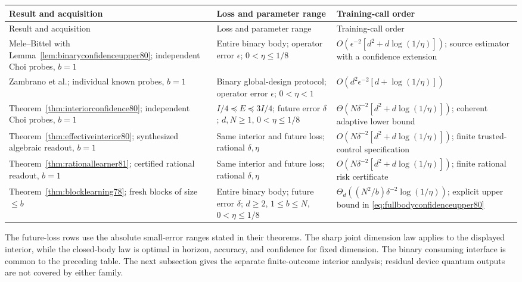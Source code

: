 \begingroup
\small
\setlength{\tabcolsep}{4pt}
\renewcommand{\arraystretch}{1.17}
\begin{longtable}{@{}>{\raggedright\arraybackslash}p{}>{\raggedright\arraybackslash}p{}>{\raggedright\arraybackslash}p{}@{}}
\toprule
Result and acquisition & Loss and parameter range & Training-call order\\
\midrule
\endfirsthead
\toprule
Result and acquisition & Loss and parameter range & Training-call order\\
\midrule
\endhead
Mele--Bittel with Lemma~\ref{lem:binaryconfidenceupper80};
independent Choi probes, $b=1$ &
Entire binary body; operator error $\epsilon$;
$0<\eta\le1/8$ &
$O(\epsilon^{-2}[d^2+d\log(1/\eta)])$;
source estimator with a confidence extension\\
Zambrano et al.; individual known probes, $b=1$ &
Binary global-design protocol; operator error $\epsilon$;
$0<\eta<1$ &
$O(d^2\epsilon^{-2}[d+\log(1/\eta)])$\\
Theorem~\ref{thm:interiorconfidence80}; independent Choi probes,
$b=1$ &
$I/4\preceq E\preceq3I/4$; future error $\delta$;
$d,N\ge1$, $0<\eta\le1/8$ &
$\Theta(N\delta^{-2}[d^2+d\log(1/\eta)])$;
coherent adaptive lower bound\\
Theorem~\ref{thm:effectiveinterior80}; synthesized algebraic
readout, $b=1$ &
Same interior and future loss; rational $\delta,\eta$ &
$O(N\delta^{-2}[d^2+d\log(1/\eta)])$;
finite trusted-control specification\\
Theorem~\ref{thm:rationallearner81}; certified rational readout,
$b=1$ &
Same interior and future loss; rational $\delta,\eta$ &
$O(N\delta^{-2}[d^2+d\log(1/\eta)])$;
finite rational risk certificate\\
Theorem~\ref{thm:blocklearning78}; fresh blocks of size $\le b$ &
Entire binary body; future error $\delta$;
$d\ge2$, $1\le b\le N$, $0<\eta\le1/8$ &
$\Theta_d((N^2/b)\delta^{-2}\log(1/\eta))$;
explicit upper bound in
\eqref{eq:fullbodyconfidenceupper80}\\
\bottomrule
\end{longtable}
\endgroup
The future-loss rows use the absolute small-error ranges stated in
their theorems.  The sharp joint dimension law applies to the
displayed interior, while the closed-body law is optimal in
horizon, accuracy, and confidence for fixed dimension.  The binary
consuming interface is common to the preceding table.  The next
subsection gives the separate finite-outcome interior analysis;
residual device quantum outputs are not covered by either family.


